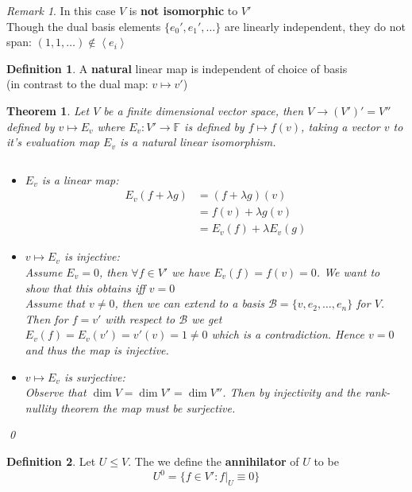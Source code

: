 \documentclass[11pt, a4paper]{report}
\makeatletter
\numberwithin{equation}{section}
\newcommand{\B}{\mathcal{B}}
\newcommand{\F}{\mathbb{F}}
\newcommand{\spn}[1]{\left\langle #1 \right\rangle}
\newcommand{\nin}{\not\in}
\numberwithin{equation}{subsection}
\theoremstyle{plain}
\newtheorem{thm}{Theorem}[chapter] %
\theoremstyle{definition}
\newtheorem{defn}{Definition}[chapter]
\theoremstyle{remark}
\newtheorem*{rem}{Remark}
\newtheorem*{prf}{Proof}
\renewenvironment{prf}[1][\proofname]{\par
  \vspace{-\topsep}%
  \normalfont
  \topsep0pt \partopsep0pt %
  \trivlist
  \item[\hskip\labelsep
        \itshape
    #1\@addpunct{.}]\ignorespaces
}{%
  \popQED\endtrivlist\@endpefalse
  \addvspace{6pt plus 6pt} %
}
\newcommand{\pr}[1]{\begin{adjustwidth}{1cm}{} \begin{prf} #1 \end{prf} \end{adjustwidth}}
\makeatother
\begin{document}
\begin{rem}
In this case $V$ is \textbf{not isomorphic} to $V'$\\
Though the dual basis elements $\{ e_0', e_1', \ldots \}$ are linearly independent, they do not span: $(1,1,\ldots) \nin \spn{e_i}$
\end{rem}

\begin{defn} 
A \textbf{natural} linear map is independent of choice of basis\\ (in contrast to the dual map: $v \mapsto v'$)
\end{defn}

\newpage

\begin{thm}
Let $V$ be a finite dimensional vector space, then $V \to (V')' = V''$ defined by $v \mapsto E_v$ where $E_v : V' \to \F$ is defined by $f \mapsto f(v)$, taking a vector $v$ to it's evaluation map $E_v$ is a natural linear isomorphism.

\pr{${}$
\begin{itemize}
\item $E_v$ is a linear map:
\begin{align*}
E_v (f + \lambda g)	&= (f + \lambda g)(v)\\
					&= f(v) + \lambda g(v)\\
					&= E_v(f) + \lambda E_v(g)
\end{align*}

\item $v \mapsto E_v$ is injective:\\
Assume $E_v = 0$, then $\forall f \in V'$ we have $E_v(f) = f(v) = 0$. We want to show that this obtains iff $v = 0$\\
Assume that $v \neq 0$, then we can extend to a basis $\B = \{v, e_2, \ldots, e_n\}$ for $V$. Then for $f = v'$ with respect to $\B$ we get $E_v(f) = E_v(v') = v'(v) = 1 \neq 0$ which is a contradiction. Hence $v = 0$ and thus the map is injective.

\item $v \mapsto E_v$ is surjective:\\
Observe that $\dim V = \dim V' = \dim V''$. Then by injectivity and the rank-nullity theorem the map must be surjective. 
\end{itemize}
}\qed
\end{thm}

\begin{defn}
Let $U \leq V$. The we define the \textbf{annihilator} of $U$ to be
$$U^0 = \{ f \in V' : f|_U \equiv 0 \}$$
\end{defn}
\end{document}
